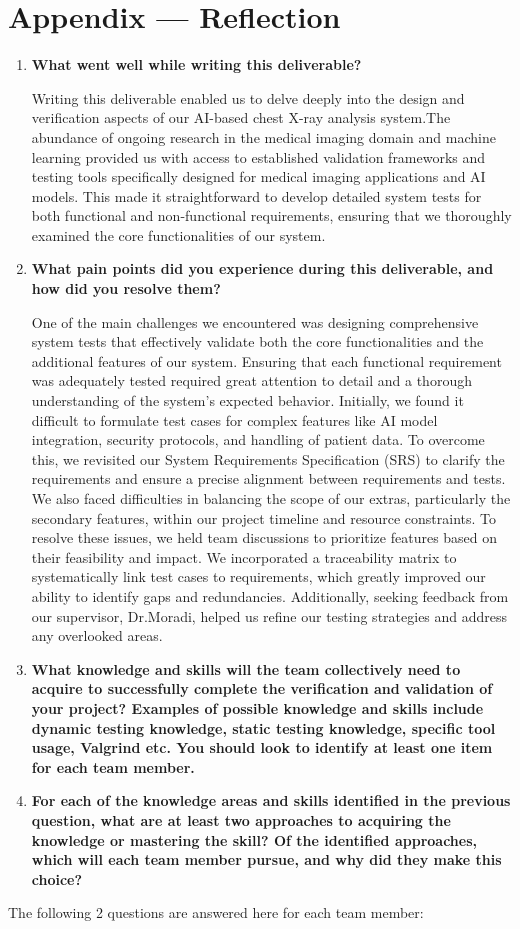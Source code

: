\documentclass[12pt, titlepage]{article}
\begin{document}
\section*{Appendix --- Reflection}
\begin{enumerate}
  \item \textbf{What went well while writing this deliverable?}
  
  Writing this deliverable enabled us to delve deeply into the design and verification aspects of our AI-based chest X-ray analysis system.The abundance of ongoing research in the medical imaging domain and machine learning provided us with access to established validation frameworks and testing tools specifically designed for medical imaging applications and AI models. This made it straightforward to develop detailed system tests for both functional and non-functional requirements, ensuring that we thoroughly examined the core functionalities of our system.
  \item \textbf{What pain points did you experience during this deliverable, and how
    did you resolve them?}
    
  One of the main challenges we encountered was designing comprehensive system tests that effectively validate both the core functionalities and the additional features of our system. Ensuring that each functional requirement was adequately tested required great attention to detail and a thorough understanding of the system's expected behavior. Initially, we found it difficult to formulate test cases for complex features like AI model integration, security protocols, and handling of patient data. To overcome this, we revisited our System Requirements Specification (SRS) to clarify the requirements and ensure a precise alignment between requirements and tests. We also faced difficulties in balancing the scope of our extras, particularly the secondary features, within our project timeline and resource constraints. To resolve these issues, we held team discussions to prioritize features based on their feasibility and impact. We incorporated a traceability matrix to systematically link test cases to requirements, which greatly improved our ability to identify gaps and redundancies. Additionally, seeking feedback from our supervisor, Dr.Moradi, helped us refine our testing strategies and address any overlooked areas. 
  \item \textbf{What knowledge and skills will the team collectively need to acquire to
  successfully complete the verification and validation of your project?
  Examples of possible knowledge and skills include dynamic testing knowledge,
  static testing knowledge, specific tool usage, Valgrind etc.  You should look to
  identify at least one item for each team member.}

  \item \textbf{For each of the knowledge areas and skills identified in the previous
  question, what are at least two approaches to acquiring the knowledge or
  mastering the skill?  Of the identified approaches, which will each team
  member pursue, and why did they make this choice?}
\end{enumerate}
The following 2 questions are answered here for each team member:
\end{document}
